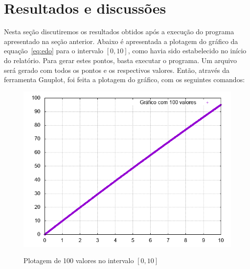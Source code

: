 \documentclass[12pt, hidelinks]{article}
\begin{document}


\newpage
\section{Resultados e discussões}

Nesta seção discutiremos os resultados obtidos após a execução do programa apresentado na seção anterior. Abaixo é apresentada a plotagem do gráfico da equação~\eqref{eq:edo} para o intervalo $[0, 10]$, como havia sido estabelecido no início do relatório. Para gerar estes pontos, basta executar o programa. Um arquivo será gerado com todos os pontos e os respectivos valores. Então, através da ferramenta Gnuplot, foi feita a plotagem do gráfico, com os seguintes comandos:



\begin{figure}[!h]
  \centering
  \includegraphics[width=12cm]{figuras/graph.png}\\
  \caption{Plotagem de 100 valores no intervalo $[0,10]$ }\label{fig:graph}
\end{figure}
\newpage
\end{document}
